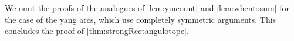 \documentclass{amsart}
\newtheorem{lemma}[theorem]{Lemma}
\theoremstyle{definition}
\newcommand{\darkblue}{\color{darkblue}} %
\newcommand{\defn}[1]{\textsl{\darkblue #1}} %
\begin{document}
We omit the proofs of the analogues of \cref{lem:yincount} and \cref{lem:whentosum} for the case of the yang arcs, which use completely symmetric arguments.
This concludes the proof of \cref{thm:strongRectangulotope}.


{}


\label{sec:biblio}

\end{document}
